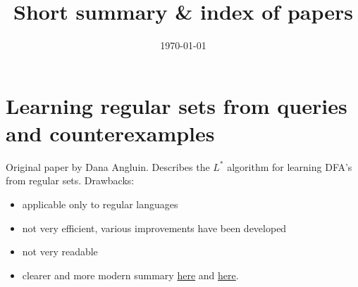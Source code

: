 \documentclass[11pt]{article}
\title{\textbf{Short summary \& index of papers}}
\author{}
\date{\today}
\begin{document}
\maketitle

\section{\cite{Angluin87} Learning regular sets from queries and counterexamples}
Original paper by Dana Angluin.
Describes the $L^*$ algorithm for learning DFA's from regular sets.
Drawbacks:
\begin{itemize}
  \item applicable only to regular languages
  \item not very efficient, various improvements have been developed
  \item not very readable
  \item clearer and more modern summary
        \href{https://www.cs.bgu.ac.il/~beimel/Courses/Learning/}{here} and
        \href{https://www.cs.bgu.ac.il/~beimel/Courses/Learning/lect3.ps}{here}.
\end{itemize}

\section{\cite{deRuiter15} }



{}

\end{document}
